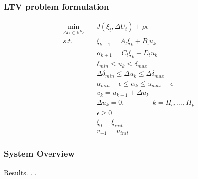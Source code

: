 \documentclass{beamer}
\begin{document}
\begin{frame}
\frametitle{LTV problem formulation}

\begin{align*}
\min_{\Delta U \in \mathbb{R}^{H_p}} \quad &J(\xi_t, \Delta U_t) + \rho \epsilon \\
s.t. \qquad &\xi_{k+1} = A_t \xi_k + B_t u_k \\
&\alpha_{k+1} = C_t \xi_k + D_t u_k \\
&\delta_{min} \leq u_k \leq \delta_{max} \\ 
&\Delta \delta_{min} \leq \Delta u_k \leq \Delta \delta_{max} \\
&\alpha_{min} - \epsilon \leq \alpha_k \leq \alpha_{max} + \epsilon \\
&u_k = u_{k-1} + \Delta u_k \\
&\Delta u_k = 0, \qquad \qquad k = H_c, . . . , H_p \\
&\epsilon \geq 0 \\
&\xi_0 = \xi_{init} \\
& u_{-1} = u_{init}
\end{align*}

\end{frame}







\begin{frame}
\frametitle{System Overview}
Results. . .

\end{frame}


% 
% 
\end{document}
